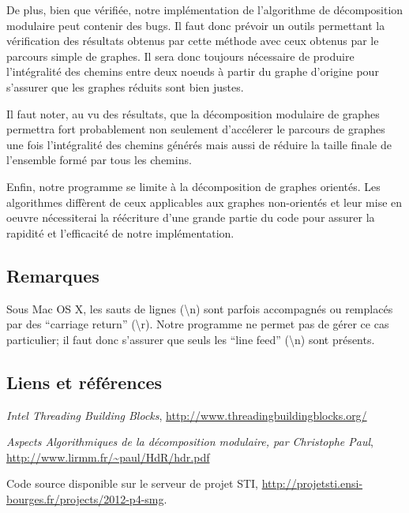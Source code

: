 \documentclass[pdftex,a4paper,titlepage,11pt,openright]{article}
\begin{document}
De plus, bien que vérifiée, notre implémentation de l'algorithme de décomposition modulaire peut contenir des bugs. Il faut donc prévoir un outils permettant la vérification des résultats obtenus par cette méthode avec ceux obtenus par le parcours simple de graphes. Il sera donc toujours nécessaire de produire l'intégralité des chemins entre deux noeuds à partir du graphe d'origine pour s'assurer que les graphes réduits sont bien justes.

Il faut noter, au vu des résultats, que la décomposition modulaire de graphes permettra fort probablement non seulement d'accélerer le parcours de graphes une fois l'intégralité des chemins générés mais aussi de réduire la taille finale de l'ensemble formé par tous les chemins.

Enfin, notre programme se limite à la décomposition de graphes orientés. Les algorithmes diffèrent de ceux applicables aux graphes non-orientés et leur mise en oeuvre nécessiterai la réécriture d'une grande partie du code pour assurer la rapidité et l'efficacité de notre implémentation.


\newpage
{}
\subsection*{Remarques}

Sous Mac OS X, les sauts de lignes (\textbackslash n) sont parfois accompagnés ou remplacés par des ``carriage return'' (\textbackslash r). Notre programme ne permet pas de gérer ce cas particulier; il faut donc s'assurer que seuls les ``line feed'' (\textbackslash n) sont présents.

\subsection*{Liens et références}
\begin{thebibliography}{40}
 \textit{Intel Threading Building Blocks}, \url{http://www.threadingbuildingblocks.org/}

 \textit{Aspects Algorithmiques de la décomposition modulaire, par Christophe Paul}, \url{http://www.lirmm.fr/~paul/HdR/hdr.pdf}

 Code source disponible sur le serveur de projet STI, \url{http://projetsti.ensi-bourges.fr/projects/2012-p4-smg}.
\end{thebibliography}

\end{document}
